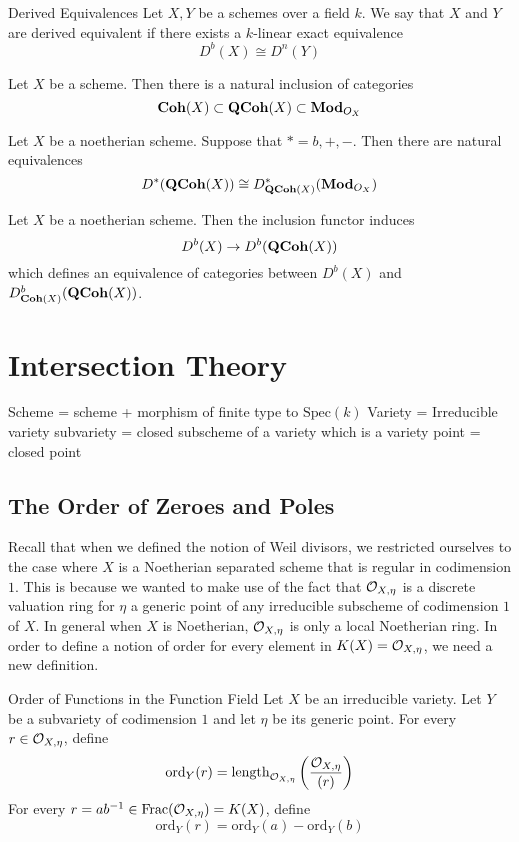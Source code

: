 \documentclass[a4paper]{article}
\begin{document}
\begin{defn}{Derived Equivalences}{} Let $X,Y$ be a schemes over a field $k$. We say that $X$ and $Y$ are derived equivalent if there exists a $k$-linear exact equivalence $$D^b(X)\cong D^n(Y)$$
\end{defn}

Let $X$ be a scheme. Then there is a natural inclusion of categories $$\bold{Coh}(X)\subset\bold{QCoh}(X)\subset\bold{Mod}_{O_X}$$

\begin{prp}{}{} Let $X$ be a noetherian scheme. Suppose that $\ast=b,+,-$. Then there are natural equivalences $$D^\ast(\bold{QCoh}(X))\cong D_{\bold{QCoh}(X)}^\ast(\bold{Mod}_{O_X})$$
\end{prp}

\begin{prp}{}{} Let $X$ be a noetherian scheme. Then the inclusion functor induces $$D^b(X)\to D^b(\bold{QCoh}(X))$$ which defines an equivalence of categories between $D^b(X)$ and $D_{\bold{Coh}(X)}^b(\bold{QCoh}(X))$. 
\end{prp}

\pagebreak
\section{Intersection Theory}
Scheme = scheme + morphism of finite type to $\text{Spec}(k)$
Variety = Irreducible variety
subvariety = closed subscheme of a variety which is a variety
point = closed point

\subsection{The Order of Zeroes and Poles}
Recall that when we defined the notion of Weil divisors, we restricted ourselves to the case where $X$ is a Noetherian separated scheme that is regular in codimension $1$. This is because we wanted to make use of the fact that $\mathcal{O}_{X,\eta}$ is a discrete valuation ring for $\eta$ a generic point of any irreducible subscheme of codimension $1$ of $X$. In general when $X$ is Noetherian, $\mathcal{O}_{X,\eta}$ is only a local Noetherian ring. In order to define a notion of order for every element in $K(X)=\mathcal{O}_{X,\eta}$, we need a new definition. 

\begin{defn}{Order of Functions in the Function Field}{} Let $X$ be an irreducible variety. Let $Y$ be a subvariety of codimension $1$ and let $\eta$ be its generic point. For every $r\in\mathcal{O}_{X,\eta}$, define $$\text{ord}_Y(r)=\text{length}_{\mathcal{O}_{X,\eta}}\left(\frac{\mathcal{O}_{X,\eta}}{(r)}\right)$$ For every $r=ab^{-1}\in\text{Frac}(\mathcal{O}_{X,\eta})=K(X)$, define $$\text{ord}_Y(r)=\text{ord}_Y(a)-\text{ord}_Y(b)$$
\end{defn}
\end{document}
